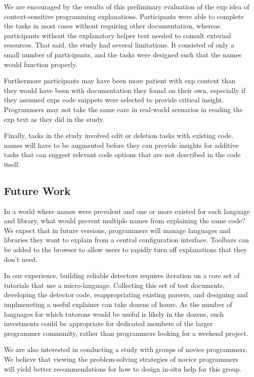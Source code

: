 We are encouraged by the results of this preliminary evaluation of the \gls{exp} idea of context-sensitive programming explanations.
Participants were able to complete the tasks in most cases without requiring other documentation, whereas participants without the explanatory helper text needed to consult external resources.
That said, the study had several limitations.  It consisted of only a small number of participants, and the tasks were designed such that the \glspl{name} would function properly. 

Furthermore participants may have been more patient with \gls{exp} content than they would have been with documentation they found on their own, especially if they assumed \glspl{exp} code snippets were selected to provide critical insight.
Programmers may not take the same care in real-world scenarios in reading the \gls{exp} text as they did in the study.

Finally, tasks in the study involved edit or deletion tasks with existing code.
\Glspl{name} will have to be augmented before they can provide insights for additive tasks that can suggest relevant code options that are not described in the code itself.

\subsection{Future Work}

In a world where \glspl{name} were prevalent and one or more existed for each language and library, what would prevent multiple \glspl{name} from explaining the same code?
We expect that in future versions, programmers will manage languages and libraries they want to explain from a central configuration interface.
Toolbars can be added to the browser to allow users to rapidly turn off explanations that they don't need.

\begin{changes}
In our experience, building reliable detectors requires iteration on a core set of tutorials that use a micro-language.
Collecting this set of test documents, developing the detector code, reappropriating existing parsers, and designing and implmeneting a useful explainer can take dozens of hours.
As the number of languages for which tutorons would be useful is likely in the dozens, such investments could be appropriate for dedicated members of the larger programmer community, rather than programmers looking for a weekend project.
\end{changes}

We are also interested in conducting a study with groups of  novice programmers. We believe that viewing the problem-solving strategies of novice programmers will yield better recommendations for how to design in-situ help for this group.

